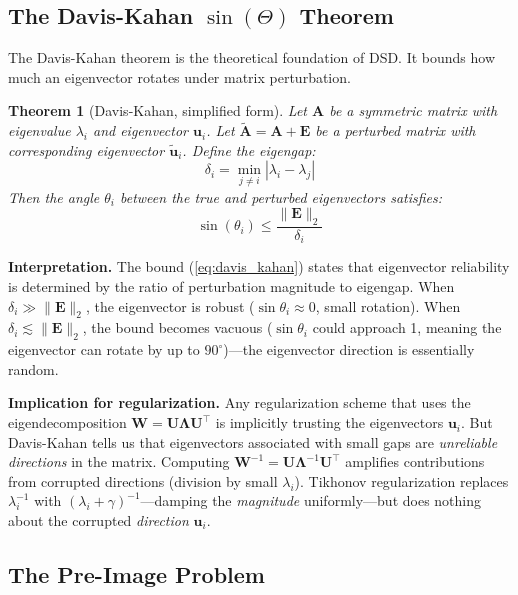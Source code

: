 \documentclass[journal]{IEEEtran}
\newtheorem{theorem}{Theorem}
\begin{document}
\subsection{The Davis-Kahan $\sin(\Theta)$ Theorem}
\label{sec:davis_kahan}

The Davis-Kahan theorem \cite{davis1970rotation} is the theoretical foundation of DSD. It bounds how much an eigenvector rotates under matrix perturbation.

\begin{theorem}[Davis-Kahan, simplified form]
Let $\bm{A}$ be a symmetric matrix with eigenvalue $\lambda_i$ and eigenvector $\bm{u}_i$. Let $\tilde{\bm{A}} = \bm{A} + \bm{E}$ be a perturbed matrix with corresponding eigenvector $\tilde{\bm{u}}_i$. Define the eigengap:
\begin{equation}
\delta_i = \min_{j \neq i} |\lambda_i - \lambda_j|
\end{equation}
Then the angle $\theta_i$ between the true and perturbed eigenvectors satisfies:
\begin{equation}
\sin(\theta_i) \leq \frac{\|\bm{E}\|_2}{\delta_i}
\label{eq:davis_kahan}
\end{equation}
\end{theorem}

\textbf{Interpretation.} The bound (\ref{eq:davis_kahan}) states that eigenvector reliability is determined by the ratio of perturbation magnitude to eigengap. When $\delta_i \gg \|\bm{E}\|_2$, the eigenvector is robust ($\sin\theta_i \approx 0$, small rotation). When $\delta_i \lesssim \|\bm{E}\|_2$, the bound becomes vacuous ($\sin\theta_i$ could approach 1, meaning the eigenvector can rotate by up to $90^\circ$)---the eigenvector direction is essentially random.

\textbf{Implication for regularization.} Any regularization scheme that uses the eigendecomposition $\bm{W} = \bm{U}\bm{\Lambda}\bm{U}^\top$ is implicitly trusting the eigenvectors $\bm{u}_i$. But Davis-Kahan tells us that eigenvectors associated with small gaps are \emph{unreliable directions} in the matrix. Computing $\bm{W}^{-1} = \bm{U}\bm{\Lambda}^{-1}\bm{U}^\top$ amplifies contributions from corrupted directions (division by small $\lambda_i$). Tikhonov regularization replaces $\lambda_i^{-1}$ with $(\lambda_i + \gamma)^{-1}$---damping the \emph{magnitude} uniformly---but does nothing about the corrupted \emph{direction} $\bm{u}_i$.

\subsection{The Pre-Image Problem}
\end{document}
